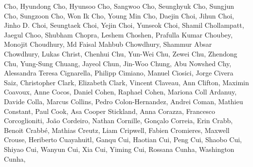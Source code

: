 Cho, Hyundong Cho, Hyunsoo Cho, Sangwoo Cho, Seunghyuk Cho, Sungjun Cho, Sungzoon Cho, Won Ik Cho, Young Min Cho, Daejin Choi, Jihun Choi, Jinho D. Choi, Seungtaek Choi, Yejin Choi, Yunseok Choi, Shamil Chollampatt, Jaegul Choo, Shubham Chopra, Leshem Choshen, Prafulla Kumar Choubey, Monojit Choudhury, Md Faisal Mahbub Chowdhury, Shammur Absar Chowdhury, Lukas Christ, Chenhui Chu, Yun-Wei Chu, Zewei Chu, Zhendong Chu, Yung-Sung Chuang, Jayeol Chun, Jin-Woo Chung, Abu Nowshed Chy, Alessandra Teresa Cignarella, Philipp Cimiano, Manuel Ciosici, Jorge Civera Saiz, Christopher Clark, Elizabeth Clark, Vincent Claveau, Ann Clifton, Maximin Coavoux, Anne Cocos, Daniel Cohen, Raphael Cohen, Mariona Coll Ardanuy, Davide Colla, Marcus Collins, Pedro Colon-Hernandez, Andrei Coman, Mathieu Constant, Paul Cook, Asa Cooper Stickland, Anna Corazza, Francesco Corcoglioniti, João Cordeiro, Nathan Cornille, Gonçalo Correia, Erin Crabb, Benoit Crabbé, Mathias Creutz, Liam Cripwell, Fabien Cromieres, Maxwell Crouse, Heriberto Cuayahuitl, Ganqu Cui, Haotian Cui, Peng Cui, Shaobo Cui, Shiyao Cui, Wanyun Cui, Xia Cui, Yiming Cui, Rossana Cunha, Washington Cunha,
